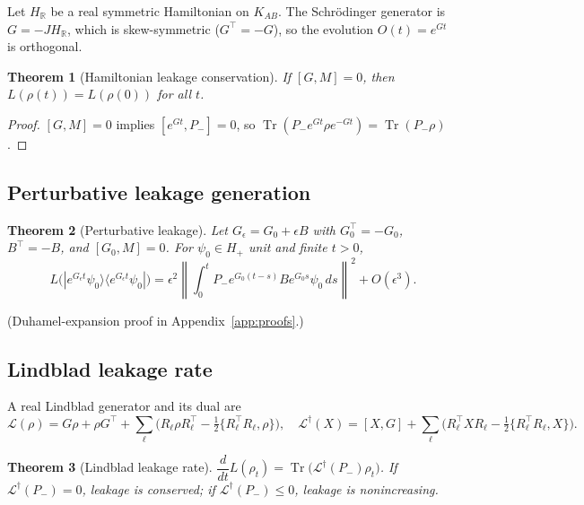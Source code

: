 \documentclass[a4paper,onecolumn,noarxiv]{quantumarticle}
\theoremstyle{plain}
\newtheorem{theorem}{Theorem}
\theoremstyle{definition}
\theoremstyle{remark}
\newcommand{\R}{\mathbb{R}}
\newcommand{\KAB}{K_{AB}}
\newcommand{\Pminus}{P_{-}}
\newcommand{\Hplus}{H_{+}}
\newcommand{\Mop}{M}
\newcommand{\Tr}{\operatorname{Tr}}
\newcommand{\Ldag}{\mathcal{L}^{\dagger}}
\newcommand{\Lleak}{L}
\begin{document}
Let $H_\R$ be a real symmetric Hamiltonian on $\KAB$. The Schr\"{o}dinger generator
is $G=-JH_\R$, which is skew-symmetric ($G^\top=-G$), so the evolution $O(t)=e^{Gt}$
is orthogonal.

\begin{theorem}[Hamiltonian leakage conservation]
\label{thm:hamiltonian}
If $[G,\Mop]=0$, then $\Lleak(\rho(t))=\Lleak(\rho(0))$ for all $t$.
\end{theorem}

\begin{proof}
$[G,\Mop]=0$ implies $[e^{Gt},\Pminus]=0$, so
$\Tr(\Pminus e^{Gt}\rho e^{-Gt})=\Tr(\Pminus\rho)$.
\end{proof}

\subsection{Perturbative leakage generation}

\begin{theorem}[Perturbative leakage]
\label{thm:perturbative}
Let $G_\epsilon=G_0+\epsilon B$ with $G_0^\top=-G_0$, $B^\top=-B$, and
$[G_0,\Mop]=0$. For $\psi_0\in\Hplus$ unit and finite $t>0$,
\begin{equation}
  \Lleak\bigl(|e^{G_\epsilon t}\psi_0\rangle\langle e^{G_\epsilon t}\psi_0|\bigr)
  = \epsilon^2\left\|\int_0^t\Pminus e^{G_0(t-s)}Be^{G_0 s}\psi_0\,ds\right\|^2
  + O(\epsilon^3).
\end{equation}
\end{theorem}

(Duhamel-expansion proof in Appendix~\ref{app:proofs}.)

\subsection{Lindblad leakage rate}

A real Lindblad generator and its dual are
\begin{equation}
  \mathcal{L}(\rho) = G\rho+\rho G^\top
  +\sum_\ell\bigl(R_\ell\rho R_\ell^\top-\tfrac{1}{2}\{R_\ell^\top R_\ell,\rho\}\bigr),
  \quad
  \Ldag(X) = [X,G]+\sum_\ell\bigl(R_\ell^\top XR_\ell
  -\tfrac{1}{2}\{R_\ell^\top R_\ell,X\}\bigr).
  \label{eq:lindblad}
\end{equation}

\begin{theorem}[Lindblad leakage rate]
\label{thm:lindblad}
$\dfrac{d}{dt}\Lleak(\rho_t) = \Tr\bigl(\Ldag(\Pminus)\rho_t\bigr)$. If
$\Ldag(\Pminus)=0$, leakage is conserved; if $\Ldag(\Pminus)\le 0$, leakage is
nonincreasing.
\end{theorem}
\end{document}

